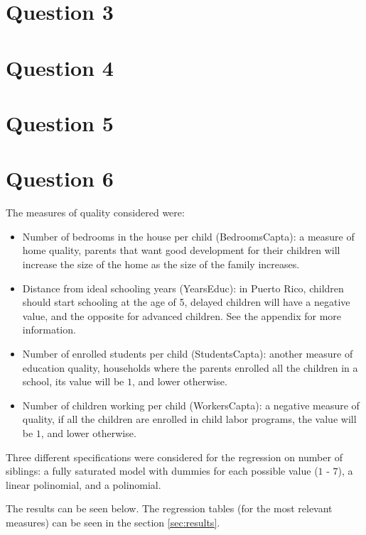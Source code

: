 \documentclass[12pt]{article}
\begin{document}
\section*{Question 3}


\section*{Question 4}


\section*{Question 5}


\section*{Question 6}

The measures of quality considered were:

\begin{itemize}
    \item Number of bedrooms in the house per child (BedroomsCapta): a measure of home quality, parents that want good development for their children will increase the size of the home as the size of the family increases.
    \item Distance from ideal schooling years (YearsEduc): in Puerto Rico, children should start schooling at the age of 5, delayed children will have a negative value, and the opposite for advanced children. See the appendix for more information.
    \item Number of enrolled students per child (StudentsCapta): another measure of education quality, households where the parents enrolled all the children in a school, its value will be $1$, and lower otherwise.
    \item Number of children working per child (WorkersCapta): a negative measure of quality, if all the children are enrolled in child labor programs, the value will be $1$, and lower otherwise.
\end{itemize}

Three different specifications were considered for the regression on number of siblings: a fully saturated model with dummies for each possible value ($1$ - $7$), a linear polinomial, and a polinomial.

The results can be seen below. The regression tables (for the most relevant measures) can be seen in the section \ref{sec:results}.
\end{document}
